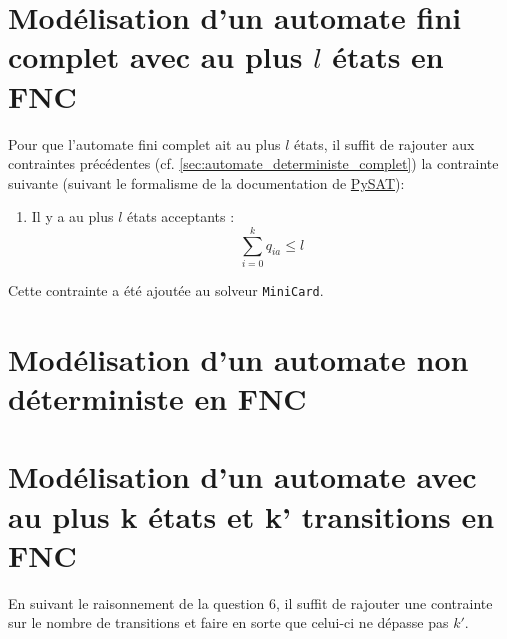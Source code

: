 \documentclass[a4paper, 12pt]{extarticle}
\begin{document}
\section{Modélisation d'un automate fini complet avec au plus $l$ états en FNC}
\noindent Pour que l'automate fini complet ait au plus $l$ états, il suffit de rajouter aux contraintes précédentes (cf. \ref{sec:automate_deterministe_complet}) 
la contrainte suivante (suivant le formalisme de la documentation de \href{https://pysathq.github.io/docs/html/api/solvers.html#pysat.solvers.Solver.add_atmost}{PySAT}):
\begin{enumerate}
    \item Il y a au plus $l$ états acceptants :
    \begin{equation*}
        \sum_{i=0}^{k} q_{ia} \le l
    \end{equation*}
\end{enumerate}
Cette contrainte a été ajoutée au solveur \texttt{MiniCard}.


\section{Modélisation d'un automate non déterministe en FNC}
\label{sec:non_deterministe}



\section{Modélisation d'un automate avec au plus k états et k' transitions en FNC}
En suivant le raisonnement de la question 6, il suffit de rajouter une contrainte sur le nombre de transitions et faire en sorte que
celui-ci ne dépasse pas $k'$.


\end{document}
